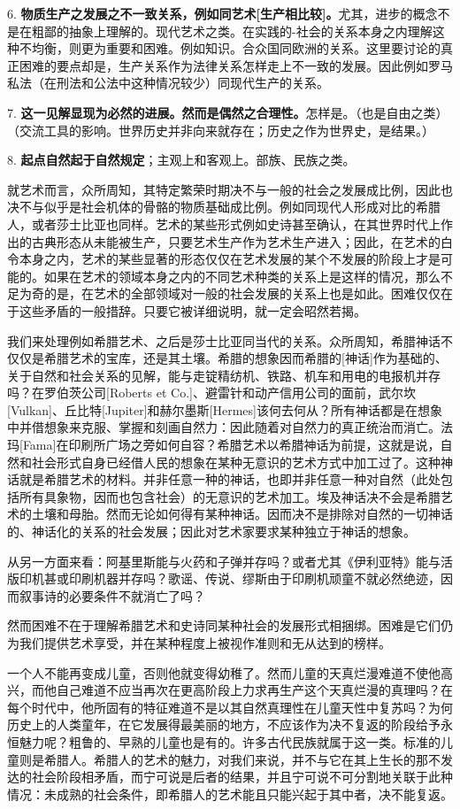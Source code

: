 \documentclass[a5paper,twoside,10.5pt]{ctexart}
\begin{document}
6. \textbf{物质生产之发展之不一致关系，例如同艺术[生产相比较]。}尤其，进步的概念不是在粗鄙的抽象上理解的。现代艺术之类。在实践的-社会的关系本身之内理解这种不均衡，则更为重要和困难。例如知识。合众国同欧洲的关系。这里要讨论的真正困难的要点却是，生产关系作为法律关系怎样走上不一致的发展。因此例如罗马私法（在刑法和公法中这种情况较少）同现代生产的关系。

7. \textbf{这一见解显现为必然的进展。然而是偶然之合理性。}怎样是。（也是自由之类）（交流工具的影响。世界历史并非向来就存在；历史之作为世界史，是结果。）

8. \textbf{起点自然起于自然规定}；主观上和客观上。部族、民族之类。

就艺术而言，众所周知，其特定繁荣时期决不与一般的社会之发展成比例，因此也决不与似乎是社会机体的骨骼的物质基础成比例。例如同现代人形成对比的希腊人，或者莎士比亚也同样。艺术的某些形式例如史诗甚至确认，在其世界时代上作出的古典形态从未能被生产，只要艺术生产作为艺术生产进入；因此，在艺术的白令本身之内，艺术的某些显著的形态仅仅在艺术发展的某个不发展的阶段上才是可能的。如果在艺术的领域本身之内的不同艺术种类的关系上是这样的情况，那么不足为奇的是，在艺术的全部领域对一般的社会发展的关系上也是如此。困难仅仅在于这些矛盾的一般措辞。只要它被详细说明，就一定会昭然若揭。

我们来处理例如希腊艺术、之后是莎士比亚同当代的关系。众所周知，希腊神话不仅仅是希腊艺术的宝库，还是其土壤。希腊的想象因而希腊的[神话]作为基础的、关于自然和社会关系的见解，能与走锭精纺机、铁路、机车和用电的电报机并存吗？在罗伯茨公司[Roberts et Co.]、避雷针和动产信用公司的面前，武尔坎[Vulkan]、丘比特[Jupiter]和赫尔墨斯[Hermes]该何去何从？所有神话都是在想象中并借想象来克服、掌握和刻画自然力：因此随着对自然力的真正统治而消亡。法玛[Fama]在印刷所广场之旁如何自容？希腊艺术以希腊神话为前提，这就是说，自然和社会形式自身已经借人民的想象在某种无意识的艺术方式中加工过了。这种神话就是希腊艺术的材料。并非任意一种的神话，也即并非任意一种对自然（此处包括所有具象物，因而也包含社会）的无意识的艺术加工。埃及神话决不会是希腊艺术的土壤和母胎。然而无论如何得有某种神话。因而决不是排除对自然的一切神话的、神话化的关系的社会发展；因此对艺术家要求某种独立于神话的想象。

从另一方面来看：阿基里斯能与火药和子弹并存吗？或者尤其《伊利亚特》能与活版印机甚或印刷机器并存吗？歌谣、传说、缪斯由于印刷机顽童不就必然绝迹，因而叙事诗的必要条件不就消亡了吗？

然而困难不在于理解希腊艺术和史诗同某种社会的发展形式相捆绑。困难是它们仍为我们提供艺术享受，并在某种程度上被视作准则和无从达到的榜样。

一个人不能再变成儿童，否则他就变得幼稚了。然而儿童的天真烂漫难道不使他高兴，而他自己难道不应当再次在更高阶段上力求再生产这个天真烂漫的真理吗？在每个时代中，他所固有的特征难道不是以其自然真理性在儿童天性中复苏吗？为何历史上的人类童年，在它发展得最美丽的地方，不应该作为决不复返的阶段给予永恒魅力呢？粗鲁的、早熟的儿童也是有的。许多古代民族就属于这一类。标准的儿童则是希腊人。希腊人的艺术的魅力，对我们来说，并不与它在其上生长的那不发达的社会阶段相矛盾，而宁可说是后者的结果，并且宁可说不可分割地关联于此种情况：未成熟的社会条件，即希腊人的艺术能且只能兴起于其中者，决不能复返。
\end{document}
